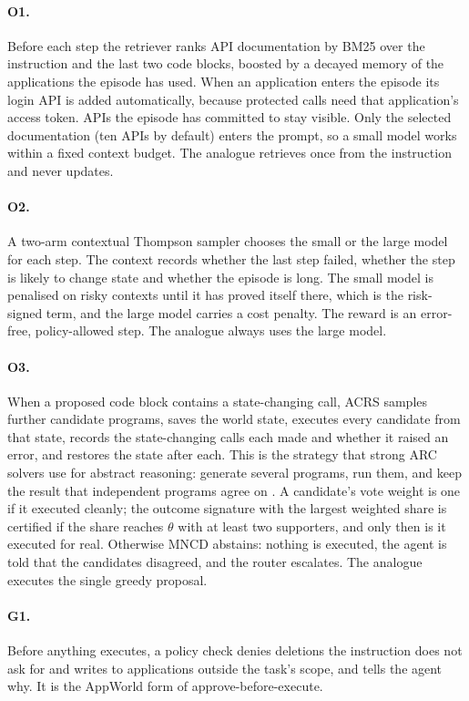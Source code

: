 \paragraph{O1.} Before each step the retriever ranks API documentation by BM25 over the instruction and
the last two code blocks, boosted by a decayed memory of the applications the episode has used. When an
application enters the episode its login API is added automatically, because protected calls need that
application's access token. APIs the episode has committed to stay visible. Only the selected
documentation (ten APIs by default) enters the prompt, so a small model works within a fixed context
budget. The analogue retrieves once from the instruction and never updates.

\paragraph{O2.} A two-arm contextual Thompson sampler chooses the small or the large model for each step.
The context records whether the last step failed, whether the step is likely to change state and whether
the episode is long. The small model is penalised on risky contexts until it has proved itself there,
which is the risk-signed term, and the large model carries a cost penalty. The reward is an error-free,
policy-allowed step. The analogue always uses the large model.

\paragraph{O3.} When a proposed code block contains a state-changing call, ACRS samples further
candidate programs, saves the world state, executes every candidate from that state, records the
state-changing calls each made and whether it raised an error, and restores the state after each. This is
the strategy that strong ARC solvers use for abstract reasoning: generate several programs, run them, and
keep the result that independent programs agree on \citep{chollet2019measure}. A candidate's vote
weight is one if it executed cleanly; the outcome signature with the largest weighted share is
certified if the share reaches $\theta$ with at least two supporters, and only then is it executed for
real. Otherwise MNCD abstains: nothing is executed, the agent is told that the candidates disagreed, and
the router escalates. The analogue executes the single greedy proposal.

\paragraph{G1.} Before anything executes, a policy check denies deletions the instruction does not ask
for and writes to applications outside the task's scope, and tells the agent why. It is the AppWorld
form of approve-before-execute.

